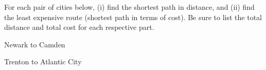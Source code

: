 \documentclass[12pt]{exam}
\begin{document}

For each pair of cities below, (i) find the shortest path in distance, and (ii) find the least expensive route (shortest path in terms of cost). Be sure to list the total distance and total cost for each respective part.

\begin{qparts}
	\item Newark to Camden
	\item Trenton to Atlantic City
\end{qparts}
\end{document}
